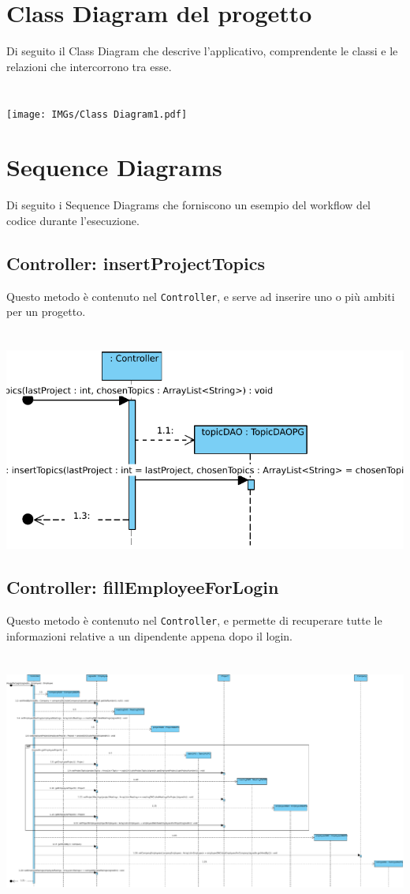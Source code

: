 \documentclass[a4paper,11pt]{report}
\begin{document}
		\section{Class Diagram del progetto}
		Di seguito il Class Diagram che descrive l'applicativo, comprendente le classi
		e le relazioni che intercorrono tra esse.\\\\\\
			\texttt{[image: IMGs/Class Diagram1.pdf]}
		\newpage
		\section{Sequence Diagrams}
			Di seguito i Sequence Diagrams che forniscono un esempio del workflow del codice durante l'esecuzione.
			\subsection{Controller: insertProjectTopics}
				Questo metodo è contenuto nel \texttt{Controller}, e serve ad inserire uno o più ambiti per un progetto.\\\\\\
				\includegraphics[width = \textwidth]{IMGs/insertProjectTopicsDiagram.pdf}
			\subsection{Controller: fillEmployeeForLogin}
				Questo metodo è contenuto nel \texttt{Controller}, e permette di recuperare tutte le informazioni relative 
				a un dipendente appena dopo il login.\\\\\\
			\includegraphics[width = \textwidth]{IMGs/fillEmployeeDiagram.pdf}
		\newpage
\end{document}
